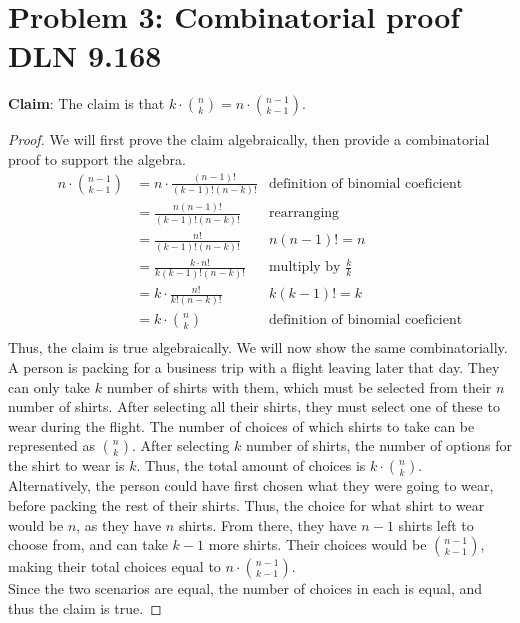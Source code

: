 \documentclass[titlepage]{article}
\begin{document}
\section{Problem 3: Combinatorial proof DLN 9.168}

\textbf{Claim}: The claim is that $k \cdot {{n}\choose{k}} = n \cdot {{n-1}\choose{k-1}}$. 
\begin{proof} We will first prove the claim algebraically, then provide a combinatorial proof to support the algebra.
\begin{align*}
n \cdot {{n-1}\choose{k-1}} &= n \cdot \frac{(n-1)!}{(k-1)!(n-k)!} & \text{definition of binomial coeficient} \\
&= \frac{n(n-1)!}{(k-1)!(n-k)!} & \text{rearranging} \\
&= \frac{n!}{(k-1)!(n-k)!} & n(n-1)! = n \\
&= \frac{k \cdot n!}{k(k-1)!(n-k)!} & \text{multiply by $\frac{k}{k}$} \\
&= k \cdot \frac{n!}{k!(n-k)!} & k(k-1)! = k \\
&= k \cdot {{n}\choose{k}} & \text{definition of binomial coeficient} \\
\end{align*}
Thus, the claim is true algebraically. We will now show the same combinatorially. \\
A person is packing for a business trip with a flight leaving later that day. They can only take $k$ number of shirts with them, which must be selected from their $n$ number of shirts. After selecting all their shirts, they must select one of these to wear during the flight. The number of choices of which shirts to take can be represented as ${n}\choose{k}$. After selecting $k$ number of shirts, the number of options for the shirt to wear is $k$. Thus, the total amount of choices is $k \cdot {{n}\choose{k}}$.\\
Alternatively, the person could have first chosen what they were going to wear, before packing the rest of their shirts. Thus, the choice for what shirt to wear would be $n$, as they have $n$ shirts. From there, they have $n-1$ shirts left to choose from, and can take $k-1$ more shirts. Their choices would be ${n-1}\choose{k-1}$, making their total choices equal to $n \cdot {{n-1}\choose{k-1}}$. \\
Since the two scenarios are equal, the number of choices in each is equal, and thus the claim is true.
\end{proof}
\end{document}

